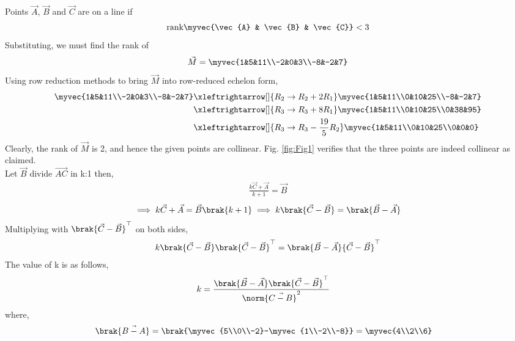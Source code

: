 \begin{enumerate}[label=\thesection.\arabic*.,ref=\thesection.\theenumi]
		Points $\vec{A}$, $\vec{B}$ and $\vec{C}$ are on a line if
    \begin{align}
        \textrm{rank}\myvec{\vec{A} & \vec{B} & \vec{C}} < 3
        \label{eq:chapters/12/10/5/8rank-collinear}
    \end{align}
    Substituting, we must find the rank of
    \begin{align}
        \vec{M} = \myvec{1&5&11\\-2&0&3\\-8&-2&7}
    \end{align}
    Using row reduction methods to bring $\vec{M}$ into row-reduced echelon form,
    \begin{align}
        \myvec{1&5&11\\-2&0&3\\-8&-2&7}&\xleftrightarrow[]{R_2\rightarrow R_2+2R_1}
        \myvec{1&5&11\\0&10&25\\-8&-2&7} \\
                &\xleftrightarrow[]{R_3\rightarrow R_3+8R_1}\myvec{1&5&11\\0&10&25\\0&38&95} \\
                &\xleftrightarrow[]{R_3\rightarrow R_3-\frac{19}{5}R_2}\myvec{1&5&11\\0&10&25\\0&0&0}
                \label{eq:chapters/12/10/5/8row-red}
    \end{align}
    Clearly, the rank of $\vec{M}$ is 2, and hence the given points are 
    collinear. 
    Fig. \ref{fig:Fig1}  verifies that the three points are indeed 
    collinear as claimed.\\
	Let $\vec{B}$ divide $\vec{AC}$ in k:1 then,
	\begin{align}
		\frac{k\vec{C}+\vec{A}}{k+1} = \vec{B}
	\end{align}
		\begin{align}
			\implies k\vec{C}+\vec{A}=\vec{B}\brak{k+1}
			\implies k\brak{\vec{C}-\vec{B}}=\brak{\vec{B}-\vec{A}}
		\end{align}
			Multiplying with $\brak{\vec{C}-\vec{B}}^{\top}$ on both sides,\\
	
		\begin{align*}
			 k\brak{\vec{C}-\vec{B}}\brak{\vec{C}-\vec{B}}^{\top}=\brak{\vec{B}-\vec{A}}{\vec{C}-\vec{B}}^{\top}
		\end{align*}
			The value of k is as follows,
			\begin{align}
			k &=
			\frac{\brak{\vec{B}-\vec{A}}\brak{\vec{C}-\vec{B}}^{\top}}{\norm{\vec{C-B}}^2}
			\end{align}
			where,
			\begin{align}
				\brak{\vec{B-A}} &=
				\brak{\myvec{5\\0\\-2}-\myvec{1\\-2\\-8}} =
				\myvec{4\\2\\6}
			\end{align}
			

\end{enumerate}
